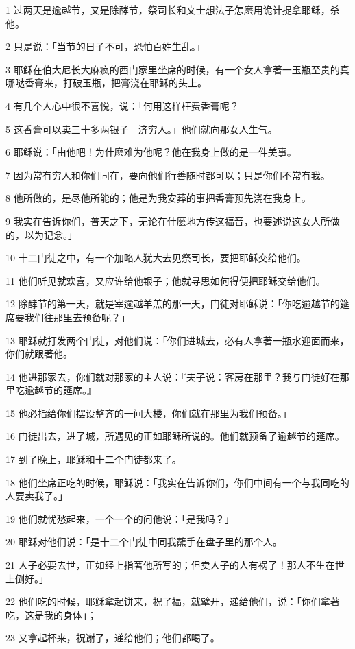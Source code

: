 \par 1 过两天是逾越节，又是除酵节，祭司长和文士想法子怎麽用诡计捉拿耶稣，杀他。
\par 2 只是说：「当节的日子不可，恐怕百姓生乱。」
\par 3 耶稣在伯大尼长大麻疯的西门家里坐席的时候，有一个女人拿著一玉瓶至贵的真哪哒香膏来，打破玉瓶，把膏浇在耶稣的头上。
\par 4 有几个人心中很不喜悦，说：「何用这样枉费香膏呢？
\par 5 这香膏可以卖三十多两银子　济穷人。」他们就向那女人生气。
\par 6 耶稣说：「由他吧！为什麽难为他呢？他在我身上做的是一件美事。
\par 7 因为常有穷人和你们同在，要向他们行善随时都可以；只是你们不常有我。
\par 8 他所做的，是尽他所能的；他是为我安葬的事把香膏预先浇在我身上。
\par 9 我实在告诉你们，普天之下，无论在什麽地方传这福音，也要述说这女人所做的，以为记念。」
\par 10 十二门徒之中，有一个加略人犹大去见祭司长，要把耶稣交给他们。
\par 11 他们听见就欢喜，又应许给他银子；他就寻思如何得便把耶稣交给他们。
\par 12 除酵节的第一天，就是宰逾越羊羔的那一天，门徒对耶稣说：「你吃逾越节的筵席要我们往那里去预备呢？」
\par 13 耶稣就打发两个门徒，对他们说：「你们进城去，必有人拿著一瓶水迎面而来，你们就跟著他。
\par 14 他进那家去，你们就对那家的主人说：『夫子说：客房在那里？我与门徒好在那里吃逾越节的筵席。』
\par 15 他必指给你们摆设整齐的一间大楼，你们就在那里为我们预备。」
\par 16 门徒出去，进了城，所遇见的正如耶稣所说的。他们就预备了逾越节的筵席。
\par 17 到了晚上，耶稣和十二个门徒都来了。
\par 18 他们坐席正吃的时候，耶稣说：「我实在告诉你们，你们中间有一个与我同吃的人要卖我了。」
\par 19 他们就忧愁起来，一个一个的问他说：「是我吗？」
\par 20 耶稣对他们说：「是十二个门徒中同我蘸手在盘子里的那个人。
\par 21 人子必要去世，正如经上指著他所写的；但卖人子的人有祸了！那人不生在世上倒好。」
\par 22 他们吃的时候，耶稣拿起饼来，祝了福，就擘开，递给他们，说：「你们拿著吃，这是我的身体」；
\par 23 又拿起杯来，祝谢了，递给他们；他们都喝了。
